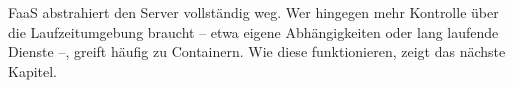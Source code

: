 FaaS abstrahiert den Server vollständig weg. Wer hingegen mehr Kontrolle über
die Laufzeitumgebung braucht – etwa eigene Abhängigkeiten oder lang laufende
Dienste –, greift häufig zu Containern. Wie diese funktionieren, zeigt das
nächste Kapitel.

